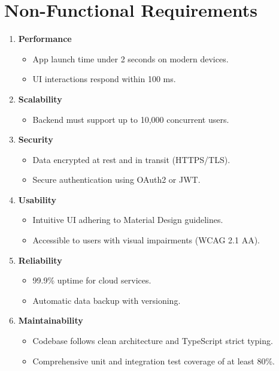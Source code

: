 \documentclass[12pt,a4paper]{article}
\begin{document}
\section{Non-Functional Requirements}

\begin{enumerate}[label=\textbf{NFR\arabic*:}, leftmargin=*, itemsep=0.5em]

  \item \textbf{Performance}
        \begin{itemize}
            \item App launch time under 2 seconds on modern devices.
            \item UI interactions respond within 100 ms.
        \end{itemize}

  \item \textbf{Scalability}
        \begin{itemize}
            \item Backend must support up to 10,000 concurrent users.
        \end{itemize}

  \item \textbf{Security}
        \begin{itemize}
            \item Data encrypted at rest and in transit (HTTPS/TLS).
            \item Secure authentication using OAuth2 or JWT.
        \end{itemize}

  \item \textbf{Usability}
        \begin{itemize}
            \item Intuitive UI adhering to Material Design guidelines.
            \item Accessible to users with visual impairments (WCAG 2.1 AA).
        \end{itemize}

  \item \textbf{Reliability}
        \begin{itemize}
            \item 99.9\% uptime for cloud services.
            \item Automatic data backup with versioning.
        \end{itemize}

  \item \textbf{Maintainability}
        \begin{itemize}
            \item Codebase follows clean architecture and TypeScript strict typing.
            \item Comprehensive unit and integration test coverage of at least 80\%.
        \end{itemize}


\end{enumerate}
\end{document}
